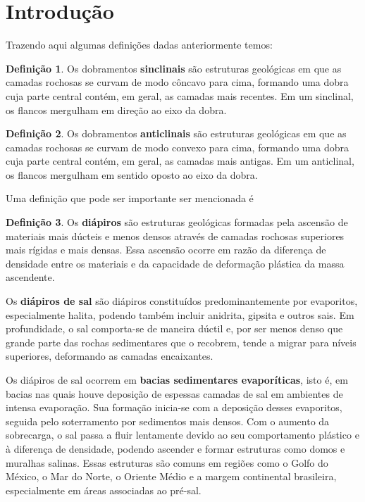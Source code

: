 \documentclass[a4paper,12pt]{article}
\theoremstyle{definition}
\theoremstyle{definition}
\theoremstyle{definition}
\newtheorem{definicao}{Definição}[section]
\begin{document}
\tableofcontents
\newpage

\section{Introdução}

Trazendo aqui algumas definições dadas anteriormente temos:
\begin{definicao}

Os dobramentos \textbf{sinclinais} são estruturas geológicas em que as camadas rochosas se curvam de modo côncavo para cima, formando uma dobra cuja parte central contém, em geral, as camadas mais recentes. Em um sinclinal, os flancos mergulham em direção ao eixo da dobra.

\end{definicao}

\begin{definicao}
 Os dobramentos \textbf{anticlinais} são estruturas geológicas em que as camadas rochosas se curvam de modo convexo para cima, formando uma dobra cuja parte central contém, em geral, as camadas mais antigas. Em um anticlinal, os flancos mergulham em sentido oposto ao eixo da dobra.   
\end{definicao}

Uma definição que pode ser importante ser mencionada é 

\begin{definicao}
Os \textbf{diápiros} são estruturas geológicas formadas pela ascensão de materiais mais dúcteis e menos densos através de camadas rochosas superiores mais rígidas e mais densas. Essa ascensão ocorre em razão da diferença de densidade entre os materiais e da capacidade de deformação plástica da massa ascendente.

Os \textbf{diápiros de sal} são diápiros constituídos predominantemente por evaporitos, especialmente halita, podendo também incluir anidrita, gipsita e outros sais. Em profundidade, o sal comporta-se de maneira dúctil e, por ser menos denso que grande parte das rochas sedimentares que o recobrem, tende a migrar para níveis superiores, deformando as camadas encaixantes.

Os diápiros de sal ocorrem em \textbf{bacias sedimentares evaporíticas}, isto é, em bacias nas quais houve deposição de espessas camadas de sal em ambientes de intensa evaporação. Sua formação inicia-se com a deposição desses evaporitos, seguida pelo soterramento por sedimentos mais densos. Com o aumento da sobrecarga, o sal passa a fluir lentamente devido ao seu comportamento plástico e à diferença de densidade, podendo ascender e formar estruturas como domos e muralhas salinas. Essas estruturas são comuns em regiões como o Golfo do México, o Mar do Norte, o Oriente Médio e a margem continental brasileira, especialmente em áreas associadas ao pré-sal.

\end{definicao}
\end{document}
